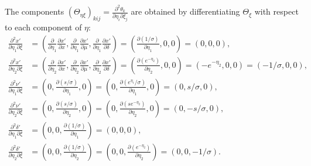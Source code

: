 \documentclass{article}
\begin{document}
The components $(\Theta_{\eta\xi})_{kij} = \frac{\partial^2 \theta_k}{\partial \eta_i \partial \xi_j}$ are obtained by differentiating $\Theta_\xi$ with respect to each component of $\eta$:
%
\begin{align}
  \frac{\partial^2 x'}{\partial \eta_1 \partial \xi}      & = \left( \frac{\partial}{\partial \eta_1}\frac{\partial x'}{\partial x}, \frac{\partial}{\partial \eta_1}\frac{\partial x'}{\partial \mu}, \frac{\partial}{\partial \eta_1}\frac{\partial x'}{\partial \delta} \right) = \left( \frac{\partial (1/\sigma)}{\partial \eta_1}, 0, 0 \right) = (0, 0, 0),                                   \\
  \frac{\partial^2 x'}{\partial \eta_2 \partial \xi}      & = \left( \frac{\partial}{\partial \eta_2}\frac{\partial x'}{\partial x}, \frac{\partial}{\partial \eta_2}\frac{\partial x'}{\partial \mu}, \frac{\partial}{\partial \eta_2}\frac{\partial x'}{\partial \delta} \right) = \left( \frac{\partial (e^{-\eta_2})}{\partial \eta_2}, 0, 0 \right) = (-e^{-\eta_2}, 0, 0) = (-1/\sigma, 0, 0), \\
  \frac{\partial^2 \nu'}{\partial \eta_1 \partial \xi}    & = \left( 0, \frac{\partial (s/\sigma)}{\partial \eta_1}, 0 \right) = \left( 0, \frac{\partial (e^{\eta_1}/\sigma)}{\partial \eta_1}, 0 \right) = (0, s/\sigma, 0),                                                                                                                                                                       \\
  \frac{\partial^2 \nu'}{\partial \eta_2 \partial \xi}    & = \left( 0, \frac{\partial (s/\sigma)}{\partial \eta_2}, 0 \right) = \left( 0, \frac{\partial (s e^{-\eta_2})}{\partial \eta_2}, 0 \right) = (0, -s/\sigma, 0),                                                                                                                                                                          \\
  \frac{\partial^2 \delta'}{\partial \eta_1 \partial \xi} & = \left( 0, 0, \frac{\partial (1/\sigma)}{\partial \eta_1} \right) = (0, 0, 0),                                                                                                                                                                                                                                                          \\
  \frac{\partial^2 \delta'}{\partial \eta_2 \partial \xi} & = \left( 0, 0, \frac{\partial (1/\sigma)}{\partial \eta_2} \right) = \left( 0, 0, \frac{\partial (e^{-\eta_2})}{\partial \eta_2} \right) = (0, 0, -1/\sigma).
\end{align}
\end{document}
